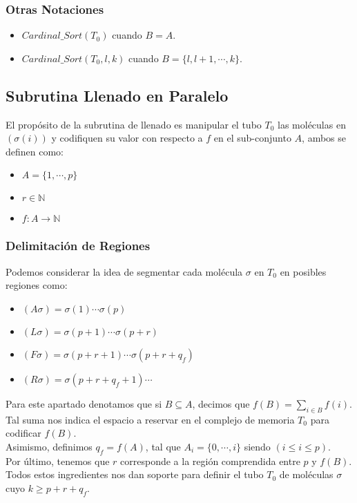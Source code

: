 \documentclass[12pt]{beamer}
\begin{document}
 \begin{frame}
     \frametitle{Otras Notaciones}
     \begin{itemize}
        \item $Cardinal\_Sort(T_0)$ cuando $B=A$.
        \item $Cardinal\_Sort(T_0, l, k)$ cuando $B=\{l, l+1,\cdots,k\}$.
    \end{itemize}
 \end{frame}
 \begin{frame}
     \subsection{Subrutina Llenado en Paralelo}
     El propósito de la subrutina de llenado es manipular el tubo $T_0$ las moléculas en $(\sigma(i))$ y codifiquen su valor con respecto a $f$ en el sub-conjunto $A$, ambos se definen como:
   \begin{itemize}
       \item $A=\{1,\cdots,p\}$
       \item $r \in \mathbb{N}$
       \item $f:A\rightarrow\mathbb{N}$
   \end{itemize} 
 \end{frame}
 \begin{frame}
     \frametitle{Delimitación de Regiones}
     Podemos considerar la idea de segmentar cada molécula $\sigma$ en $T_0$ en posibles regiones como:
    \begin{itemize}
        \item $(A\sigma )=\sigma (1)\cdots\sigma (p)$
        \item $(L\sigma )=\sigma (p+1)\cdots\sigma (p+r)$
        \item $(F\sigma)=\sigma(p+r+1)\cdots\sigma(p+r+q_f)$
        \item $(R\sigma)=\sigma(p+r+q_f+1)\cdots$
    \end{itemize}
 \end{frame}
 \begin{frame}
    Para este apartado denotamos que si $B\subseteq A$, decimos que  $f(B)=\sum_{i\in B}f(i)$. Tal suma nos indica el espacio a reservar en el complejo de memoria $T_0$ para codificar $f(B)$. \\
    Asimismo, definimos $q_f=f(A)$, tal que $A_i=\{0,\cdots,i\}$ siendo $(i\leq i\leq p)$. \\
    Por último, tenemos que $r$ corresponde a la región comprendida entre $p$ y $f(B)$.\\
    Todos estos ingredientes nos dan soporte para definir el tubo $T_0$ de moléculas $\sigma$ cuyo $k\geq p+r+q_f$.
 \end{frame}
\end{document}
